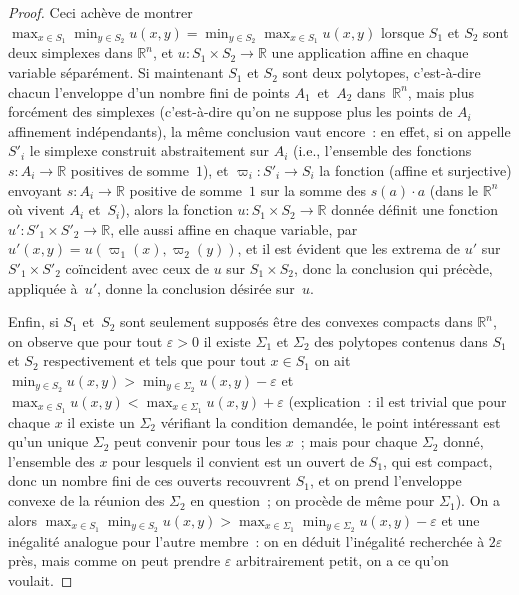 \documentclass[12pt,a4paper]{article}
\theoremstyle{definition}
\begin{document}
\begin{proof}
Ceci achève de montrer $\max_{x\in S_1} \min_{y\in S_2} u(x,y) =
\min_{y\in S_2} \max_{x\in S_1} u(x,y)$ lorsque $S_1$ et $S_2$ sont
deux simplexes dans $\mathbb{R}^n$, et $u\colon S_1\times S_2 \to
\mathbb{R}$ une application affine en chaque variable séparément.  Si
maintenant $S_1$ et $S_2$ sont deux polytopes, c'est-à-dire chacun
l'enveloppe d'un nombre fini de points $A_1$ et $A_2$
dans $\mathbb{R}^n$, mais plus forcément des simplexes (c'est-à-dire
qu'on ne suppose plus les points de $A_i$ affinement indépendants), la
même conclusion vaut encore : en effet, si on appelle $S'_i$ le
simplexe construit abstraitement sur $A_i$ (i.e., l'ensemble des
fonctions $s\colon A_i \to \mathbb{R}$ positives de somme $1$), et
$\varpi_i \colon S'_i \to S_i$ la fonction (affine et surjective)
envoyant $s\colon A_i \to \mathbb{R}$ positive de somme $1$ sur la
somme des $s(a)\cdot a$ (dans le $\mathbb{R}^n$ où vivent $A_i$
et $S_i$), alors la fonction $u\colon S_1\times S_2 \to \mathbb{R}$
donnée définit une fonction $u'\colon S'_1\times S'_2 \to \mathbb{R}$,
elle aussi affine en chaque variable, par $u'(x,y) = u(\varpi_1(x),
\varpi_2(y))$, et il est évident que les extrema de $u'$ sur $S'_1
\times S'_2$ coïncident avec ceux de $u$ sur $S_1 \times S_2$, donc la
conclusion qui précède, appliquée à $u'$, donne la conclusion désirée
sur $u$.

Enfin, si $S_1$ et $S_2$ sont seulement supposés être des convexes
compacts dans $\mathbb{R}^n$, on observe que pour tout $\varepsilon>0$
il existe $\Sigma_1$ et $\Sigma_2$ des polytopes contenus dans $S_1$
et $S_2$ respectivement et tels que pour tout $x\in S_1$ on ait
$\min_{y\in S_2} u(x,y) > \min_{y\in\Sigma_2} u(x,y)-\varepsilon$ et
$\max_{x\in S_1} u(x,y) < \max_{x\in\Sigma_1} u(x,y)+\varepsilon$
(explication : il est trivial que pour chaque $x$ il existe un
$\Sigma_2$ vérifiant la condition demandée, le point intéressant est
qu'un unique $\Sigma_2$ peut convenir pour tous les $x$ ; mais pour
chaque $\Sigma_2$ donné, l'ensemble des $x$ pour lesquels il convient
est un ouvert de $S_1$, qui est compact, donc un nombre fini de ces
ouverts recouvrent $S_1$, et on prend l'enveloppe convexe de la
réunion des $\Sigma_2$ en question ; on procède de même pour
$\Sigma_1$).  On a alors $\max_{x\in S_1} \min_{y\in S_2} u(x,y) >
\max_{x\in \Sigma_1} \min_{y\in \Sigma_2} u(x,y) - \varepsilon$ et une
inégalité analogue pour l'autre membre : on en déduit l'inégalité
recherchée à $2\varepsilon$ près, mais comme on peut prendre
$\varepsilon$ arbitrairement petit, on a ce qu'on voulait.
\end{proof}
\end{document}
